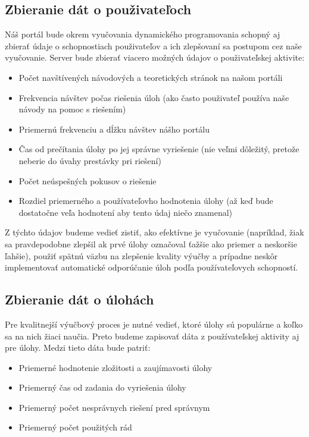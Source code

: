\subsection{Zbieranie dát o použivateľoch}
\label{zbieraniedata}
Náš portál bude okrem vyučovania dynamického programovania schopný aj zbierať údaje o
schopnostiach použivateľov a ich zlepšovaní sa postupom cez naše vyučovanie.
Server bude zbierať viacero možných údajov o použivateľskej aktivite:
\begin{itemize}
\item Počet navštívených návodových a teoretických stránok na našom portáli
\item Frekvencia návštev počas riešenia úloh (ako často použivateľ používa naše návody na pomoc s riešením)
\item Priemernú frekvenciu a dĺžku návštev nášho portálu
\item Čas od prečítania úlohy po jej správne vyriešenie (nie veľmi dôležitý, pretože neberie do úvahy prestávky pri riešení)
\item Počet neúspešných pokusov o riešenie
\item Rozdiel priemerného a používateľovho hodnotenia úlohy (až keď bude dostatočne veľa hodnotení aby tento údaj niečo znamenal)
\end{itemize}

Z týchto údajov budeme vedieť zistiť, ako efektívne je vyučovanie
(napríklad, žiak sa pravdepodobne zlepšil ak prvé úlohy označoval ťažšie ako priemer a neskoršie ľahšie),
použiť spätnú väzbu na zlepšenie kvality výučby
a prípadne neskôr implementovať automatické odporúčanie úloh podľa používateľovych schopností.

\subsection{Zbieranie dát o úlohách}
Pre kvalitnejší výučbový proces je nutné vedieť, ktoré úlohy sú populárne a koľko
sa na nich žiaci naučia. Preto budeme zapisovať dáta z používateľskej aktivity aj pre
úlohy. Medzi tieto dáta bude patriť:
\begin{itemize}
\item Priemerné hodnotenie zložitosti a zaujímavosti úlohy
\item Priemerný čas od zadania do vyriešenia úlohy
\item Priemerný počet nesprávnych riešení pred správnym
\item Priemerný počet použitých rád
\end{itemize}

